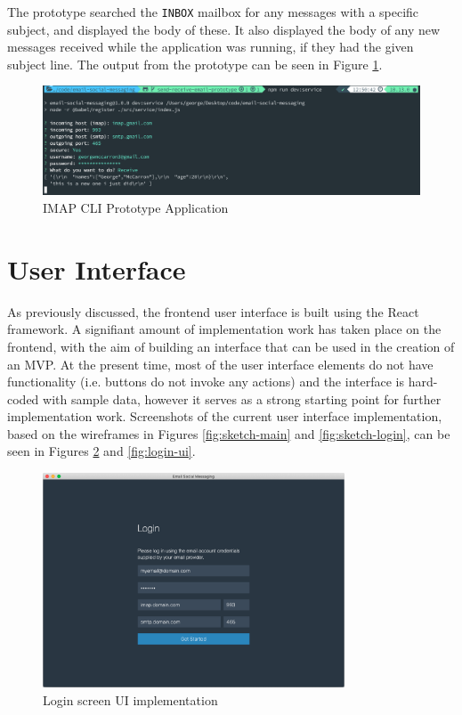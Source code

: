 The prototype searched the \texttt{INBOX} mailbox for any messages with a specific subject, and displayed the body of these. It also displayed the body of any new messages received while the application was running, if they had the given subject line. The output from the prototype can be seen in Figure \ref{fig:imap-cli}.

\begin{figure}[h!]
  \centering
  \includegraphics[width=\textwidth]{images/imap-cli.png}
  \caption{IMAP CLI Prototype Application}
  \label{fig:imap-cli}
\end{figure}

\section{User Interface}
As previously discussed, the frontend user interface is built using the React framework. A signifiant amount of implementation work has taken place on the frontend, with the aim of building an interface that can be used in the creation of an MVP. At the present time, most of the user interface elements do not have functionality (i.e. buttons do not invoke any actions) and the interface is hard-coded with sample data, however it serves as a strong starting point for further implementation work. Screenshots of the current user interface implementation, based on the wireframes in Figures \ref{fig:sketch-main} and \ref{fig:sketch-login}, can be seen in Figures \ref{fig:main-ui} and \ref{fig:login-ui}.

\begin{figure}[h!]
  \centering
  \includegraphics[width=0.8\textwidth]{images/implementation-login.png}
  \caption{Login screen UI implementation}
  \label{fig:main-ui}
\end{figure}

